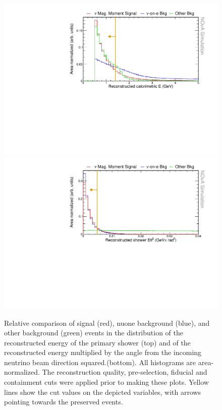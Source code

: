 \begin{figure}[hbtp]
\centering
\includegraphics[width=.9\textwidth]{Plots/NuMMEventSelection/N1Cut_calEHighPre.pdf}
\includegraphics[width=.9\textwidth]{Plots/NuMMEventSelection/N1Cut_eth2Pre.pdf}
\caption[Reconstructed energy and $E\theta^2$ cuts]{Relative comparison of signal (red), \acrshort{nuone} background (blue), and other background (green) events in the distribution of the reconstructed energy of the primary shower (top) and of the reconstructed energy multiplied by the angle from the incoming neutrino beam direction squared.(bottom). All histograms are area-normalized. The reconstruction quality, pre-selection, fiducial and containment cuts were applied prior to making these plots. Yellow lines show the cut values on the depicted variables, with arrows pointing towards the preserved events.}
\label{fig:NuMMCutsTMVA2}
\end{figure}

